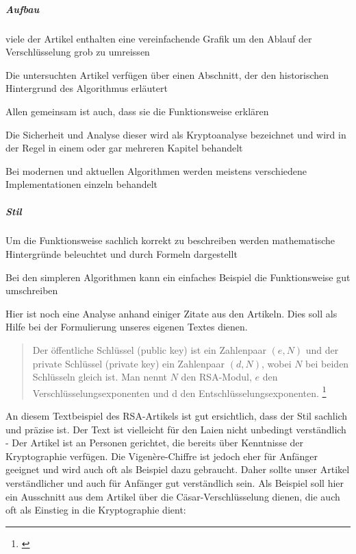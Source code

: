 \documentclass[11pt,paper=a4,final]{scrartcl}
\begin{document}
\subparagraph{Aufbau}
\begin{itemize*}
  \item viele der Artikel enthalten eine vereinfachende Grafik um den Ablauf der
  Verschl\"usselung grob zu umreissen
  \item Die untersuchten Artikel verf\"ugen \"uber einen Abschnitt, der den
  historischen Hintergrund des Algorithmus erl\"autert
  \item Allen gemeinsam ist auch, dass sie die Funktionsweise erkl\"aren
  \item Die Sicherheit und Analyse dieser wird als Kryptoanalyse bezeichnet und
  wird in der Regel in einem oder gar mehreren Kapitel behandelt
  \item Bei modernen und aktuellen Algorithmen werden meistens verschiedene
  Implementationen einzeln behandelt
\end{itemize*}
\subparagraph{Stil}
\begin{itemize*}
  \item Um die Funktionsweise sachlich korrekt zu beschreiben werden
  mathematische Hintergr\"unde beleuchtet und durch Formeln dargestellt
  \item Bei den simpleren Algorithmen kann ein einfaches Beispiel die
  Funktionsweise gut umschreiben
\end{itemize*}

Hier ist noch eine Analyse anhand einiger Zitate aus den Artikeln. Dies soll als
Hilfe bei der Formulierung unseres eigenen Textes dienen.

\begin{quote}
  \frqq Der öffentliche Schlüssel (public key) ist ein Zahlenpaar \((e,N)\) und
  der private Schlüssel (private key) ein Zahlenpaar \((d,N)\), wobei \(N\) bei
  beiden Schlüsseln gleich ist. Man nennt \(N\) den RSA-Modul, \(e\) den
  Verschlüsselungsexponenten und d den Entschlüsselungsexponenten.\flqq
  \footnote{\cite{wiki:Caesar-Verschluesselung}}
\end{quote}

An diesem Textbeispiel des RSA-Artikels ist gut ersichtlich, dass der Stil
sachlich und pr\"azise ist. Der Text ist vielleicht f\"ur den Laien nicht
unbedingt verst\"andlich - Der Artikel ist an Personen gerichtet, die bereits
\"uber Kenntnisse der Kryptographie verf\"ugen. Die Vigen\`ere-Chiffre ist
jedoch eher f\"ur Anf\"anger geeignet und wird auch oft als Beispiel dazu
gebraucht. Daher sollte unser Artikel verst\"andlicher und auch f\"ur Anf\"anger
gut verst\"andlich sein. Als Beispiel soll hier ein Ausschnitt aus dem Artikel
\"uber die C\"asar-Verschl\"usselung dienen, die auch oft als Einstieg in die
Kryptographie dient:
\end{document}
